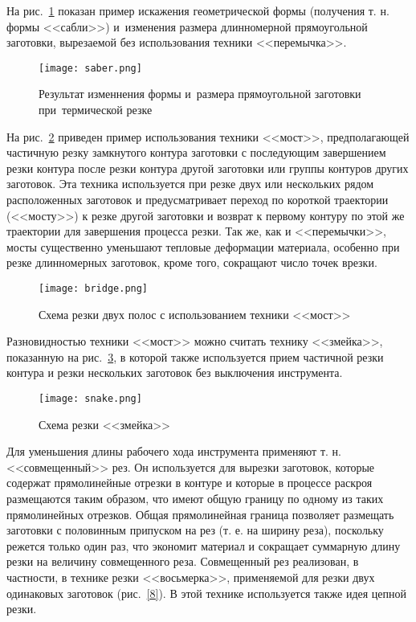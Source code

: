 На рис.~\ref{saber} показан пример искажения геометрической формы
(получения т. н. формы <<сабли>>)
и~изменения размера длинномерной прямоугольной заготовки,
вырезаемой без использования техники <<перемычка>>.

\begin{figure}[h]
  \begin{center}
  \texttt{[image: saber.png]}
  \caption{
    Результат изменнения формы
    и~размера прямоугольной заготовки
    при~термической резке
    }
  \label{saber}
  \end{center}
\end{figure}

На рис.~\ref{bridge}
приведен пример использования техники <<мост>>,
предполагающей  частичную резку замкнутого контура
заготовки с последующим завершением резки контура
после резки контура другой заготовки или
группы контуров других заготовок.
Эта техника используется при резке двух или
нескольких рядом расположенных заготовок и
предусматривает переход по короткой траектории (<<мосту>>)
к резке другой заготовки и возврат к первому контуру
по этой же траектории для завершения процесса резки.
Так же, как и <<перемычки>>,
мосты существенно уменьшают тепловые деформации материала,
особенно при резке длинномерных заготовок,
кроме того, сокращают число точек врезки.

\begin{figure}[h]
  \begin{center}
  \texttt{[image: bridge.png]}
  \caption{Схема резки двух полос с использованием техники <<мост>>}
  \label{bridge}
  \end{center}
\end{figure}

Разновидностью техники <<мост>> можно считать технику <<змейка>>,
показанную на рис.~\ref{snake},
в которой также используется прием
частичной резки контура и резки
нескольких заготовок без выключения инструмента.

\begin{figure}[h]
  \begin{center}
  \texttt{[image: snake.png]}
  \caption{Схема резки <<змейка>>}
  \label{snake}
  \end{center}
\end{figure}

Для уменьшения длины рабочего хода инструмента
применяют т. н. <<совмещенный>> рез.
Он используется для вырезки заготовок,
которые содержат прямолинейные отрезки в контуре
и которые в процессе раскроя размещаются таким образом,
что имеют общую границу по одному из таких прямолинейных отрезков.
Общая прямолинейная граница позволяет размещать
заготовки с половинным припуском на рез
(т. е. на ширину реза),
поскольку режется только один раз,
что экономит материал и сокращает суммарную
длину резки на величину совмещенного реза.
Совмещенный рез реализован, в частности,
в технике резки <<восьмерка>>,
применяемой для резки двух одинаковых заготовок
(рис.~\ref{8}).
В этой технике используется также идея цепной резки.

